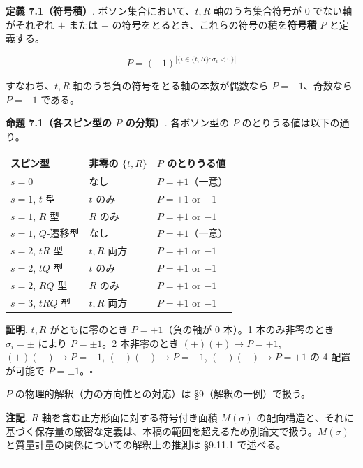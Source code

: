 \documentclass[
  a4paper,11pt]{ltjsarticle}
\newcounter{none}
\theoremstyle{definition}
\theoremstyle{remark}
\begin{document}
\textbf{定義 7.1（符号積）}. ボソン集合において、\(t, R\)
軸のうち集合符号が \(0\) でない軸がそれぞれ \(+\) または \(-\)
の符号をとるとき、これらの符号の積を\textbf{符号積} \(P\) と定義する。

\[P = (-1)^{|\{i \in \{t, R\} : \sigma_i < 0\}|}\]

すなわち、\(t, R\) 軸のうち負の符号をとる軸の本数が偶数なら
\(P = +1\)、奇数なら \(P = -1\) である。

\textbf{命題 7.1（各スピン型の \(P\) の分類）}. 各ボソン型の \(P\)
のとりうる値は以下の通り。

{\def\LTcaptype{none} %
\begin{longtable}[]{@{}lll@{}}
\toprule\noalign{}
スピン型 & 非零の \(\{t, R\}\) & \(P\) のとりうる値 \\
\midrule\noalign{}
\endhead
\bottomrule\noalign{}
\endlastfoot
\(s = 0\) & なし & \(P = +1\)（一意） \\
\(s = 1\), \(t\) 型 & \(t\) のみ & \(P = +1\) or \(-1\) \\
\(s = 1\), \(R\) 型 & \(R\) のみ & \(P = +1\) or \(-1\) \\
\(s = 1\), \(Q\)-遷移型 & なし & \(P = +1\)（一意） \\
\(s = 2\), \(tR\) 型 & \(t, R\) 両方 & \(P = +1\) or \(-1\) \\
\(s = 2\), \(tQ\) 型 & \(t\) のみ & \(P = +1\) or \(-1\) \\
\(s = 2\), \(RQ\) 型 & \(R\) のみ & \(P = +1\) or \(-1\) \\
\(s = 3\), \(tRQ\) 型 & \(t, R\) 両方 & \(P = +1\) or \(-1\) \\
\end{longtable}
}

\textbf{証明}. \(t, R\) がともに零のとき \(P = +1\)（負の軸が 0 本）。1
本のみ非零のとき \(\sigma_i = \pm\) により \(P = \pm 1\)。2 本非零のとき
\((+)(+) \to P = +1\), \((+)(-) \to P = -1\), \((-)(+) \to P = -1\),
\((-)(-) \to P = +1\) の 4 配置が可能で \(P = \pm 1\)。\(\square\)

\(P\) の物理的解釈（力の方向性との対応）は §9（解釈の一例）で扱う。

\textbf{注記}. \(R\) 軸を含む正方形面に対する符号付き面積 \(M(\sigma)\)
の配向構造と、それに基づく保存量の厳密な定義は、本稿の範囲を超えるため別論文で扱う。\(M(\sigma)\)
と質量計量の関係についての解釈上の推測は §9.11.1 で述べる。

\begin{center}\rule{0.5\linewidth}{0.5pt}\end{center}
\end{document}
